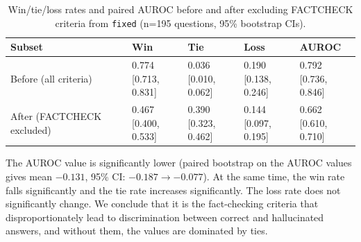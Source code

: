 \documentclass{article}
\begin{document}
\begin{table}[H]
  \centering
 \begin{tabularx}{\textwidth}{@{} l *{4}{>{\centering\arraybackslash}X} @{}}
    \toprule
    Subset & Win & Tie & Loss & AUROC \\
    \midrule
    Before (all criteria)
      & \makecell{0.774 \\ \scriptsize{[0.713, 0.831]}}
      & \makecell{0.036 \\ \scriptsize{[0.010, 0.062]}}
      & \makecell{0.190 \\ \scriptsize{[0.138, 0.246]}}
      & \makecell{0.792 \\ \scriptsize{[0.736, 0.846]}} \\[0.4em]
    After (FACTCHECK excluded)
      & \makecell{0.467 \\ \scriptsize{[0.400, 0.533]}}
      & \makecell{0.390 \\ \scriptsize{[0.323, 0.462]}}
      & \makecell{0.144 \\ \scriptsize{[0.097, 0.195]}}
      & \makecell{0.662 \\ \scriptsize{[0.610, 0.710]}} \\
    \bottomrule
  \end{tabularx}
    \caption{Win/tie/loss rates and paired AUROC before and after excluding
        FACTCHECK criteria from \texttt{fixed} (n=195 questions, 95\%
        bootstrap CIs).}
  \label{tab:factcheck-criteria-excluded}
\end{table}

The AUROC value is significantly lower (paired bootstrap on the AUROC values gives mean $-0.131$, 95\% CI: $-0.187 \rightarrow -0.077$). At the same time, the win rate falls significantly and the tie rate increases significantly. The loss rate does not significantly change. We conclude that it is the fact-checking criteria that disproportionately lead to discrimination between correct and hallucinated answers, and without them, the values are dominated by ties.
\end{document}

